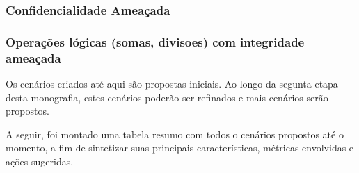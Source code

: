 %
%
%
%


\subsubsection{Confidencialidade Ameaçada}



\subsubsection{Operações lógicas (somas, divisoes) com integridade ameaçada}



Os cenários criados até aqui são propostas iniciais. Ao longo da segunta etapa desta monografia, estes cenários poderão ser refinados e mais cenários serão propostos.

A seguir, foi montado uma tabela resumo com todos o cenários propostos até o momento, a fim de sintetizar suas principais características, métricas envolvidas e ações sugeridas.


